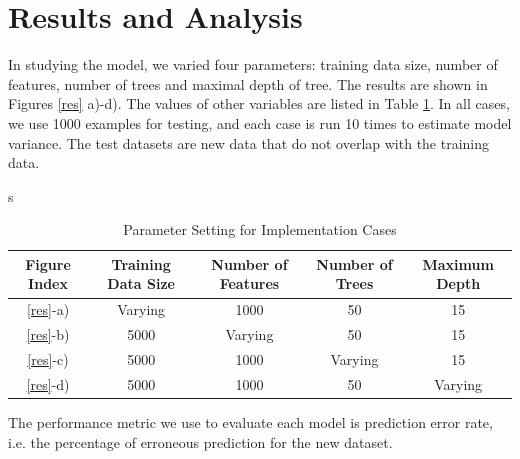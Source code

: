 \documentclass[11pt]{article}
\begin{document}
\section{Results and Analysis}
In studying the model, we varied four parameters: training data size, number of features, number of trees and maximal depth of tree. The results are shown in Figures \ref{res} a)-d). The values of other variables are listed in Table \ref{tab1}. In all cases, we use 1000 examples for testing, and each case is run 10 times to estimate model variance. The test datasets are new data that do not overlap with the training data.\\
\begin{table}[H]
	\caption{Parameter Setting for Implementation Cases}
	\label{tab1}s
	\begin{tabular}{|c |c |c |c |c|}
		\hline
		Figure Index & Training Data Size & Number of Features & Number of Trees & Maximum Depth\\
		\hline
		\ref{res}-a) & Varying & 1000 & 50 & 15 \\
		\hline
		\ref{res}-b) & 5000 & Varying & 50 & 15 \\
		\hline
		\ref{res}-c) & 5000 & 1000 & Varying & 15\\
		\hline
		\ref{res}-d) & 5000 & 1000 & 50 & Varying \\
		\hline
	\end{tabular}
\end{table}

The performance metric we use to evaluate each model is prediction error rate, i.e. the percentage of erroneous prediction for the new dataset.\\
\end{document}
